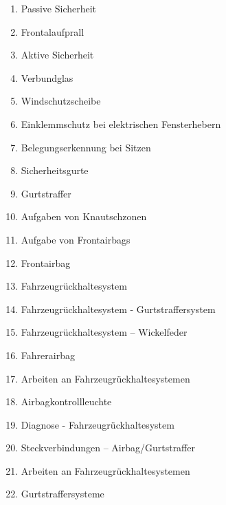 \begin{enumerate}
\item
  Passive Sicherheit\\
\item
  Frontalaufprall\\
\item
  Aktive Sicherheit\\
\item
  Verbundglas\\
\item
  Windschutzscheibe\\
\item
  Einklemmschutz bei elektrischen Fensterhebern\\
\item
  Belegungserkennung bei Sitzen\\
\item
  Sicherheitsgurte\\
\item
  Gurtstraffer\\
\item
  Aufgaben von Knautschzonen\\
\item
  Aufgabe von Frontairbags\\
\item
  Frontairbag\\
\item
  Fahrzeugrückhaltesystem\\
\item
  Fahrzeugrückhaltesystem - Gurtstraffersystem\\
\item
  Fahrzeugrückhaltesystem -- Wickelfeder\\
\item
  Fahrerairbag\\
\item
  Arbeiten an Fahrzeugrückhaltesystemen\\
\item
  Airbagkontrollleuchte\\
\item
  Diagnose - Fahrzeugrückhaltesystem\\
\item
  Steckverbindungen -- Airbag/Gurtstraffer\\
\item
  Arbeiten an Fahrzeugrückhaltesystemen\\
\item
  Gurtstraffersysteme\\

\end{enumerate}
